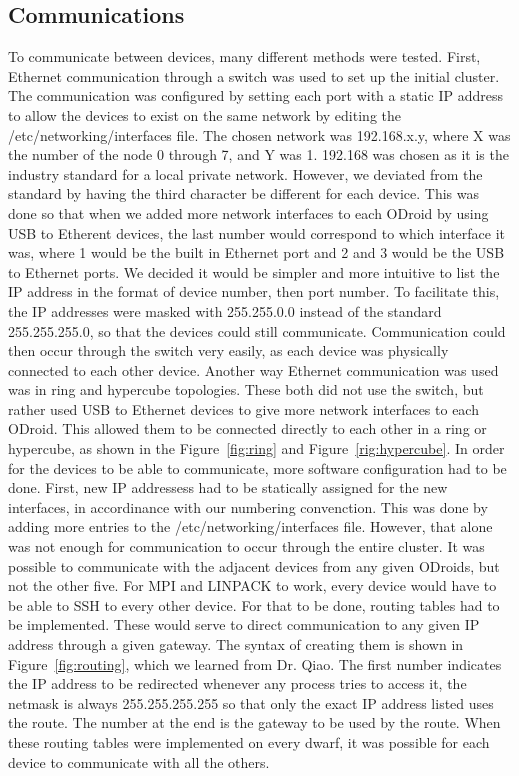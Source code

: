  \subsection{Communications}
	To communicate between devices, many different methods were tested. First, Ethernet communication through a switch was used to set up the initial cluster. The communication was configured by setting each port with a static IP address to allow the devices to exist on the same network by editing the /etc/networking/interfaces file. The chosen network was 192.168.x.y, where X was the number of the node 0 through 7, and Y was 1. 192.168 was chosen as it is the industry standard for a local private network. However, we deviated from the standard by having the third character be different for each device. This was done so that when we added more network interfaces to each ODroid by using USB to Etherent devices, the last number would correspond to which interface it was, where 1 would be the built in Ethernet port and 2 and 3 would be the USB to Ethernet ports. We decided it would be simpler and more intuitive to list the IP address in the format of device number, then port number. To facilitate this, the IP addresses were masked with 255.255.0.0 instead of the standard 255.255.255.0, so that the devices could still communicate. Communication could then occur through the switch very easily, as each device was physically connected to each other device.
	Another way Ethernet communication was used was in ring and hypercube topologies. These both did not use the switch, but rather used USB to Ethernet devices to give more network interfaces to each ODroid. This allowed them to be connected directly to each other in a ring or hypercube, as shown in the Figure~\ref{fig:ring} and Figure~\ref{rig:hypercube}. In order for the devices to be able to communicate, more software configuration had to be done. First, new IP addressess had to be statically assigned for the new interfaces, in accordinance with our numbering convenction. This was done by adding more entries to the /etc/networking/interfaces file. However, that alone was not enough for communication to occur through the entire cluster. It was possible to communicate with the adjacent devices from any given ODroids, but not the other five. For MPI and LINPACK to work, every device would have to be able to SSH to every other device. For that to be done, routing tables had to be implemented. These would serve to direct communication to any given IP address through a given gateway. The syntax of creating them is shown in Figure~\ref{fig:routing}, which we learned from Dr. Qiao. The first number indicates the IP address to be redirected whenever any process tries to access it, the netmask is always 255.255.255.255 so that only the exact IP address listed uses the route. The number at the end is the gateway to be used by the route. When these routing tables were implemented on every dwarf, it was possible for each device to communicate with all the others.

